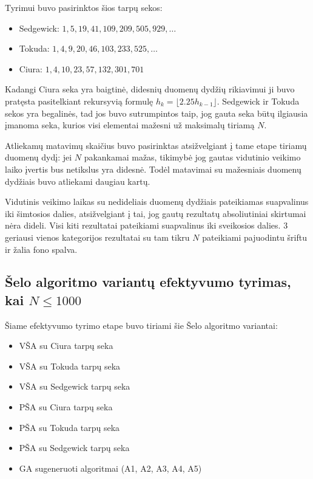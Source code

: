 \documentclass{VUMIFInfKursinis}
\begin{document}
Tyrimui buvo pasirinktos šios tarpų sekos:
\begin{itemize}
  \item Sedgewick: $1, 5, 19, 41, 109, 209, 505, 929, \ldots$ \cite{SEDGEWICK1986159}
  \item Tokuda: $1, 4, 9, 20, 46, 103, 233, 525, \ldots $ \cite{10.5555/645569.659879}
  \item Ciura: $1, 4, 10, 23, 57, 132, 301, 701$ \cite{ciura2001best}
\end{itemize}
Kadangi Ciura seka yra baigtinė, didesnių duomenų dydžių rikiavimui ji buvo pratęsta pasitelkiant rekursyvią formulę $h_{k}=\lfloor 2.25h_{k-1}\rfloor$.
Sedgewick ir Tokuda sekos yra begalinės, tad jos buvo sutrumpintos taip, jog gauta seka būtų ilgiausia įmanoma seka, kurios visi elementai mažesni už maksimalų tiriamą $N$.

Atliekamų matavimų skaičius buvo pasirinktas atsižvelgiant į tame etape tiriamų duomenų dydį: jei $N$ pakankamai mažas,
tikimybė jog gautas vidutinio veikimo laiko įvertis bus netikslus yra didesnė.
Todėl matavimai su mažesniais duomenų dydžiais buvo atliekami daugiau kartų.

Vidutinis veikimo laikas su nedideliais duomenų dydžiais pateikiamas suapvalinus iki šimtosios dalies,
atsižvelgiant į tai, jog gautų rezultatų absoliutiniai skirtumai nėra dideli.
Visi kiti rezultatai pateikiami suapvalinus iki sveikosios dalies.
3 geriausi vienos kategorijos rezultatai su tam tikru $N$ pateikiami pajuodintu šriftu ir žalia fono spalva.

\subsection{Šelo algoritmo variantų efektyvumo tyrimas, kai $N \leq 1000$}

Šiame efektyvumo tyrimo etape buvo tiriami šie Šelo algoritmo variantai:
\begin{itemize}
  \item VŠA su Ciura tarpų seka
  \item VŠA su Tokuda tarpų seka
  \item VŠA su Sedgewick tarpų seka
  \item PŠA su Ciura tarpų seka
  \item PŠA su Tokuda tarpų seka
  \item PŠA su Sedgewick tarpų seka
  \item GA sugeneruoti algoritmai (A1, A2, A3, A4, A5)
\end{itemize}
\end{document}
